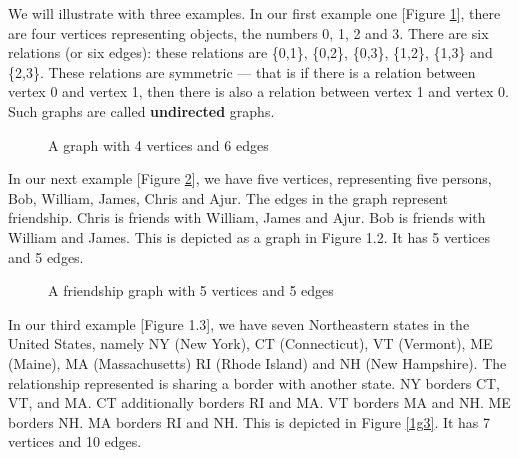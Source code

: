 We will illustrate with three examples. In our first example one [Figure \ref{1g1}], there are four vertices representing objects, the numbers 0, 1, 2 and 3. There are six relations (or six edges): these relations are \{0,1\}, \{0,2\}, \{0,3\}, \{1,2\}, \{1,3\} and \{2,3\}. These relations are symmetric --- that is if there is a relation between vertex 0 and vertex 1, then there is also a relation between vertex 1 and vertex 0. Such graphs are called \textbf{undirected} graphs.
\begin{figure}
\begin{center}
\caption{A graph with 4 vertices and 6 edges}\label{1g1}
\end{center}
\end{figure}
\begin{newpage}
\end{newpage}

In our next example [Figure \ref{1g2}], we have five vertices, representing five persons, Bob, William, James, Chris and Ajur. The edges in the graph represent friendship. Chris is friends with William, James and Ajur. Bob is friends with William and James. This is depicted as a graph in Figure 1.2. It has 5 vertices and 5 edges.
\begin{figure}
\begin{center}
\caption{A friendship graph with 5 vertices and 5 edges}\label{1g2}
\end{center}
\end{figure}
\begin{newpage}
\end{newpage}
In our third example [Figure 1.3], we have seven Northeastern states in the United States, namely NY (New York), CT (Connecticut), VT (Vermont), ME (Maine), MA (Massachusetts) RI (Rhode Island) and NH (New Hampshire). The relationship represented is sharing a border with another state. NY borders CT, VT, and MA. CT additionally borders RI and MA. VT borders MA and NH. ME borders NH. MA borders RI and NH. This is depicted in Figure \ref{1g3}. It has 7 vertices and 10 edges.

